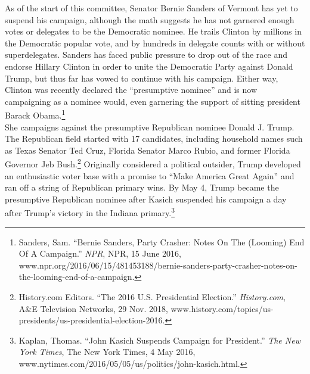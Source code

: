 \documentclass[10pt, letterpaper]{article}
\begin{document}
As of the start of this committee, Senator Bernie Sanders of Vermont has
yet to suspend his campaign, although the math suggests he has not
garnered enough votes or delegates to be the Democratic nominee. He
trails Clinton by millions in the Democratic popular vote, and by
hundreds in delegate counts with or without superdelegates. Sanders has
faced public pressure to drop out of the race and endorse Hillary
Clinton in order to unite the Democratic Party against Donald Trump, but
thus far has vowed to continue with his campaign. Either way, Clinton
was recently declared the ``presumptive nominee'' and is now campaigning
as a nominee would, even garnering the support of sitting president
Barack Obama.\footnote{Sanders, Sam. ``Bernie Sanders, Party Crasher:
  Notes On The (Looming) End Of A Campaign.'' \emph{NPR}, NPR, 15 June
  2016,
  www.npr.org/2016/06/15/481453188/bernie-sanders-party-crasher-notes-on-the-looming-end-of-a-campaign.} \\

She campaigns against the presumptive Republican nominee Donald J.
Trump. The Republican field started with 17 candidates, including
household names such as Texas Senator Ted Cruz, Florida Senator Marco
Rubio, and former Florida Governor Jeb Bush.\footnote{History.com
  Editors. ``The 2016 U.S. Presidential Election.'' \emph{History.com},
  A\&E Television Networks, 29 Nov. 2018,
  www.history.com/topics/us-presidents/us-presidential-election-2016.}
Originally considered a political outsider, Trump developed an
enthusiastic voter base with a promise to ``Make America Great Again''
and ran off a string of Republican primary wins. By May 4, Trump became
the presumptive Republican nominee after Kasich suspended his campaign a
day after Trump's victory in the Indiana primary.\footnote{Kaplan,
  Thomas. ``John Kasich Suspends Campaign for President.'' \emph{The New
  York Times}, The New York Times, 4 May 2016,
  www.nytimes.com/2016/05/05/us/politics/john-kasich.html.} \\
\end{document}

